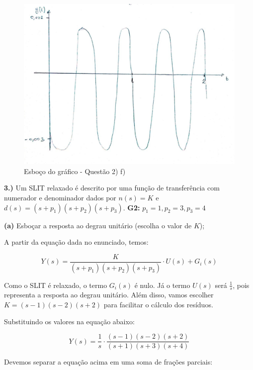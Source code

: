 \documentclass{article}
\begin{document}
\begin{figure}[h]
    \includegraphics[scale=0.25]{plot2f}
    \centering
    \caption{Esboço do gráfico - Questão 2) f)}
\end{figure}

\vspace{\baselineskip}

\textbf{3.)} Um SLIT relaxado é descrito por uma função de transferência com numerador e denominador dados por $n(s) = K$ e $d(s) = (s + p_1)(s + p_2)(s + p_3)$.
\textbf{G2:} $p_1 = 1, p_2 = 3, p_3 = 4$

\textbf{(a)} Esboçar a resposta ao degrau unitário (escolha o valor de $K$);

\vspace{\baselineskip}

A partir da equação dada no enunciado, temos:

\[ Y(s) = \frac{K}{(s+p_{1})(s+p_{2})(s+p_{3})} \cdot U(s) + G_{i}(s) \]

\vspace{\baselineskip}

Como o SLIT é relaxado, o termo $ G_{i}(s) $ é nulo.
Já o termo $ U(s) $ será $ \frac{1}{s} $, pois representa a resposta ao degrau unitário.
Além disso, vamos escolher $ K = (s-1)(s-2)(s+2) $ para facilitar o cálculo dos resíduos.

Substituindo os valores na equação abaixo:

\[ Y(s) = \frac{1}{s} \cdot \frac{(s-1)(s-2)(s+2)}{(s+1)(s+3)(s+4)} \]

Devemos separar a equação acima em uma soma de frações parciais:
\end{document}
